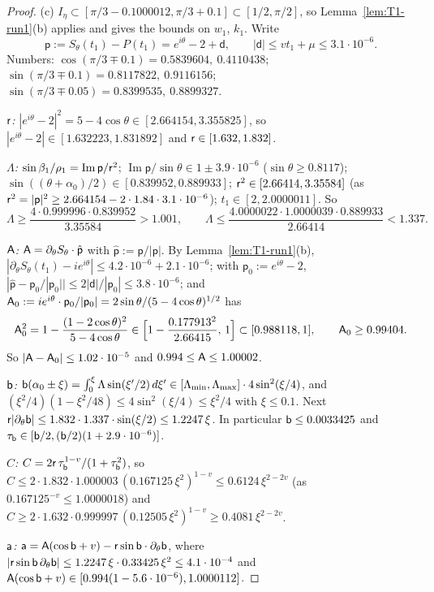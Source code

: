 \begin{proof}
(c) $I_\eta\subset[\pi/3-0.1000012,\pi/3+0.1]\subset[1/2,\pi/2]$, so Lemma~\ref{lem:T1-run1}(b) applies and gives the bounds on $w_1$,
$k_1$. Write
\[
\mathsf p:=S_\theta(t_1)-P(t_1)=e^{i\theta}-2+\mathsf d,\qquad|\mathsf d|\le vt_1+\mu\le3.1\cdot10^{-6}.
\]
Numbers: $\cos(\pi/3\mp0.1)=0.5839604,\ 0.4110438$; $\sin(\pi/3\mp0.1)=0.8117822,\ 0.9116156$;
$\sin(\pi/3\mp0.05)=0.8399535,\ 0.8899327$.

\emph{$\mathsf r$:} $|e^{i\theta}-2|^2=5-4\cos\theta\in[2.664154,3.355825]$, so $|e^{i\theta}-2|\in[1.632223,1.831892]$ and
$\mathsf r\in[1.632,1.832]$.

\emph{$\Lambda$:} $\sin\beta_1/\rho_1=\operatorname{Im}\mathsf p/\mathsf r^2$; $\operatorname{Im}\mathsf p/\sin\theta\in1\pm3.9\cdot10^{-6}$
($\sin\theta\ge0.8117$); $\sin((\theta+\alpha_0)/2)\in[0.839952,0.889933]$; $\mathsf r^2\in[2.66414,3.35584]$
(as $\mathsf r^2=|\mathsf p|^2\ge2.664154-2\cdot1.84\cdot3.1\cdot10^{-6}$); $t_1\in[2,2.0000011]$. So
\[
\Lambda\ge\frac{4\cdot0.999996\cdot0.839952}{3.35584}>1.001,\qquad\Lambda\le\frac{4.0000022\cdot1.0000039\cdot0.889933}{2.66414}<1.337 .
\]

\emph{$\mathsf A$:} $\mathsf A=\partial_\theta S_\theta\cdot\hat{\mathsf p}$ with $\hat{\mathsf p}:=\mathsf p/|\mathsf p|$. By
Lemma~\ref{lem:T1-run1}(b), $|\partial_\theta S_\theta(t_1)-ie^{i\theta}|\le4.2\cdot10^{-6}+2.1\cdot10^{-6}$; with
$\mathsf p_0:=e^{i\theta}-2$, $|\hat{\mathsf p}-\mathsf p_0/|\mathsf p_0||\le2|\mathsf d|/|\mathsf p_0|\le3.8\cdot10^{-6}$; and
$\mathsf A_0:=ie^{i\theta}\cdot\mathsf p_0/|\mathsf p_0|=2\sin\theta/(5-4\cos\theta)^{1/2}$ has
\[
\mathsf A_0^2=1-\frac{(1-2\cos\theta)^2}{5-4\cos\theta}\in\Bigl[1-\frac{0.177913^2}{2.66415},\,1\Bigr]\subset[0.988118,1],\qquad\mathsf A_0\ge0.99404 .
\]
So $|\mathsf A-\mathsf A_0|\le1.02\cdot10^{-5}$ and $0.994\le\mathsf A\le1.00002$.

\emph{$\mathsf b$:} $\mathsf b(\alpha_0\pm\xi)=\int_0^\xi\Lambda\sin(\xi'/2)\,d\xi'\in[\Lambda_{\min},\Lambda_{\max}]\cdot4\sin^2(\xi/4)$, and
$(\xi^2/4)(1-\xi^2/48)\le4\sin^2(\xi/4)\le\xi^2/4$ with $\xi\le0.1$. Next $\mathsf r|\partial_\theta\mathsf b|\le1.832\cdot1.337\cdot\sin(\xi/2)\le1.2247\,\xi$.
In particular $\mathsf b\le0.0033425$ and $\tau_{\mathsf b}\in[\mathsf b/2,(\mathsf b/2)(1+2.9\cdot10^{-6})]$.

\emph{$C$:} $C=2\mathsf r\,\tau_{\mathsf b}^{1-v}/(1+\tau_{\mathsf b}^2)$, so
$C\le2\cdot1.832\cdot1.000003\,(0.167125\,\xi^2)^{1-v}\le0.6124\,\xi^{2-2v}$ (as $0.167125^{-v}\le1.0000018$) and
$C\ge2\cdot1.632\cdot0.999997\,(0.12505\,\xi^2)^{1-v}\ge0.4081\,\xi^{2-2v}$.

\emph{$\mathsf a$:} $\mathsf a=\mathsf A(\cos\mathsf b+v)-\mathsf r\sin\mathsf b\cdot\partial_\theta\mathsf b$, where
$|\mathsf r\sin\mathsf b\,\partial_\theta\mathsf b|\le1.2247\,\xi\cdot0.33425\,\xi^2\le4.1\cdot10^{-4}$ and
$\mathsf A(\cos\mathsf b+v)\in[0.994(1-5.6\cdot10^{-6}),1.0000112]$.


\end{proof}
